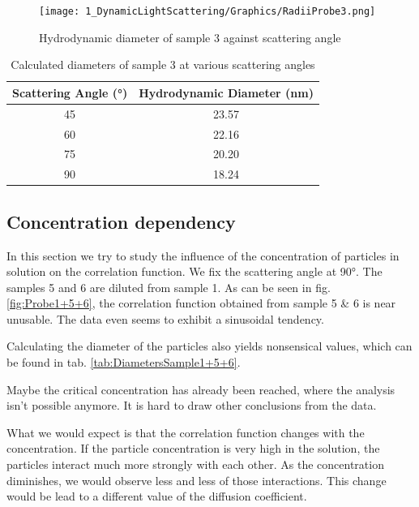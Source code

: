 \documentclass{article}
\begin{document}
\begin{figure}[!ht]
    \centering
    \texttt{[image: 1\_DynamicLightScattering/Graphics/RadiiProbe3.png]}
    \caption{Hydrodynamic diameter of sample 3 against scattering angle}
    \label{fig:RadiiProbe3}
\end{figure}
\FloatBarrier

\begin{table}[!ht]
    \centering
    \begin{tabular}{|c|c|}
    \hline
        Scattering Angle (°) & Hydrodynamic Diameter (nm) \\ \hline \hline
        45 & 23.57 \\ \hline
        60 & 22.16 \\ \hline
        75 & 20.20 \\ \hline
        90 & 18.24 \\ \hline
    \end{tabular}
    \caption{Calculated diameters of sample 3 at various scattering angles}
    \label{tab:DiametersSample3}
\end{table}
\FloatBarrier

\subsection{Concentration dependency}

In this section we try to study the influence of the concentration of particles in solution on the correlation function. We fix the scattering angle at 90°. The samples 5 and 6 are diluted from sample 1. As can be seen in fig. \ref{fig:Probe1+5+6}, the correlation function obtained from sample 5 \& 6 is near unusable. The data even seems to exhibit a sinusoidal tendency. 

Calculating the diameter of the particles also yields nonsensical values, which can be found in tab. \ref{tab:DiametersSample1+5+6}.

Maybe the critical concentration has already been reached, where the analysis isn't possible anymore. It is hard to draw other conclusions from the data.

What we would expect is that the correlation function changes with the concentration. If the particle concentration is very high in the solution, the particles interact much more strongly with each other. As the concentration diminishes, we would observe less and less of those interactions. This change would be lead to a different value of the diffusion coefficient.
\end{document}
